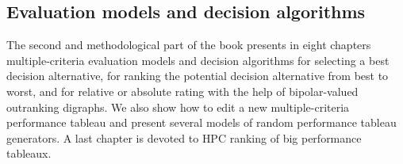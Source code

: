 % 
%
%

\begin{partbacktext}
  \part{Evaluation models and decision algorithms}
\noindent The second and methodological part of the book presents in eight chapters multiple-criteria evaluation models and decision algorithms for selecting a best decision alternative, for ranking the potential decision alternative from best to worst, and for relative or absolute rating with the help of bipolar-valued outranking digraphs. We also show how to edit a new multiple-criteria performance tableau and present several models of random performance tableau generators. A last chapter is devoted to HPC ranking of big performance tableaux.
\end{partbacktext}